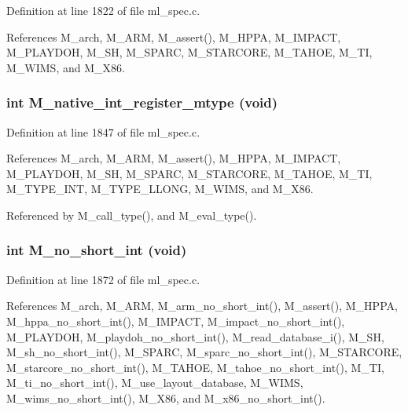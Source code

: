 Definition at line 1822 of file ml\_\-spec.c.

References M\_\-arch, M\_\-ARM, M\_\-assert(), M\_\-HPPA, M\_\-IMPACT, M\_\-PLAYDOH, M\_\-SH, M\_\-SPARC, M\_\-STARCORE, M\_\-TAHOE, M\_\-TI, M\_\-WIMS, and M\_\-X86.
\subsubsection{\setlength{\rightskip}{0pt plus 5cm}int M\_\-native\_\-int\_\-register\_\-mtype (void)}\label{m__spec_8h_eb08e74ba010028bb388755ca738cb02}




Definition at line 1847 of file ml\_\-spec.c.

References M\_\-arch, M\_\-ARM, M\_\-assert(), M\_\-HPPA, M\_\-IMPACT, M\_\-PLAYDOH, M\_\-SH, M\_\-SPARC, M\_\-STARCORE, M\_\-TAHOE, M\_\-TI, M\_\-TYPE\_\-INT, M\_\-TYPE\_\-LLONG, M\_\-WIMS, and M\_\-X86.

Referenced by M\_\-call\_\-type(), and M\_\-eval\_\-type().
\subsubsection{\setlength{\rightskip}{0pt plus 5cm}int M\_\-no\_\-short\_\-int (void)}\label{m__spec_8h_e47c6528e171db653959e325ce869454}




Definition at line 1872 of file ml\_\-spec.c.

References M\_\-arch, M\_\-ARM, M\_\-arm\_\-no\_\-short\_\-int(), M\_\-assert(), M\_\-HPPA, M\_\-hppa\_\-no\_\-short\_\-int(), M\_\-IMPACT, M\_\-impact\_\-no\_\-short\_\-int(), M\_\-PLAYDOH, M\_\-playdoh\_\-no\_\-short\_\-int(), M\_\-read\_\-database\_\-i(), M\_\-SH, M\_\-sh\_\-no\_\-short\_\-int(), M\_\-SPARC, M\_\-sparc\_\-no\_\-short\_\-int(), M\_\-STARCORE, M\_\-starcore\_\-no\_\-short\_\-int(), M\_\-TAHOE, M\_\-tahoe\_\-no\_\-short\_\-int(), M\_\-TI, M\_\-ti\_\-no\_\-short\_\-int(), M\_\-use\_\-layout\_\-database, M\_\-WIMS, M\_\-wims\_\-no\_\-short\_\-int(), M\_\-X86, and M\_\-x86\_\-no\_\-short\_\-int().
